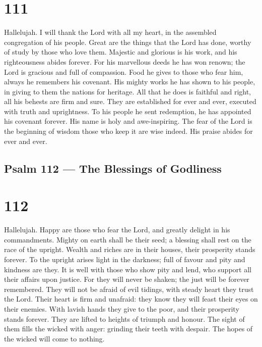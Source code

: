 \hypertarget{section-110}{%
\section{111}\label{section-110}}

 Hallelujah. I will thank the Lord with all my heart, in the
assembled congregation of his people.  Great are the things
that the Lord has done, worthy of study by those who love them.
 Majestic and glorious is his work, and his righteousness
abides forever.  For his marvellous deeds he has won renown;
the Lord is gracious and full of compassion.  Food he gives
to those who fear him, always he remembers his covenant. 
His mighty works he has shown to his people, in giving to them the
nations for heritage.  All that he does is faithful and
right, all his behests are firm and sure.  They are
established for ever and ever, executed with truth and uprightness.
 To his people he sent redemption, he has appointed his
covenant forever. His name is holy and awe-inspiring.  The
fear of the Lord is the beginning of wisdom those who keep it are wise
indeed. His praise abides for ever and ever.

\hypertarget{psalm-112-the-blessings-of-godliness}{%
\subsection{Psalm 112 --- The Blessings of
Godliness}\label{psalm-112-the-blessings-of-godliness}}

\hypertarget{section-111}{%
\section{112}\label{section-111}}

 Hallelujah. Happy are those who fear the Lord, and greatly
delight in his commandments.  Mighty on earth shall be their
seed; a blessing shall rest on the race of the upright. 
Wealth and riches are in their houses, their prosperity stands forever.
 To the upright arises light in the darkness; full of favour
and pity and kindness are they.  It is well with those who
show pity and lend, who support all their affairs upon justice.
 For they will never be shaken; the just will be forever
remembered.  They will not be afraid of evil tidings, with
steady heart they trust the Lord.  Their heart is firm and
unafraid: they know they will feast their eyes on their enemies.
 With lavish hands they give to the poor, and their
prosperity stands forever. They are lifted to heights of triumph and
honour.  The sight of them fills the wicked with anger:
grinding their teeth with despair. The hopes of the wicked will come to
nothing.

